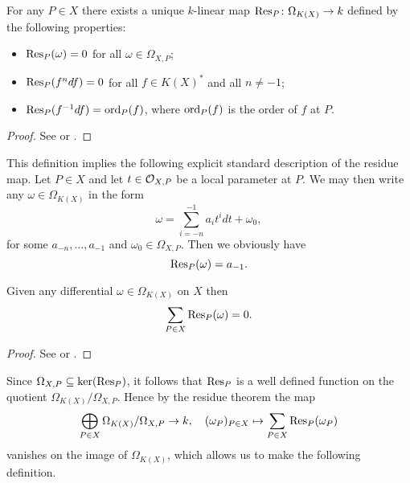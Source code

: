     \begin{thm}\label{theoremresiduemap}
    For any $P\in X$ there exists a unique $k$-linear map $\operatorname{Res}_P \colon \Omega_{K(X)} \rightarrow k$ defined by the following properties:
        \begin{itemize}
            \item $\operatorname{Res}_P(\omega) = 0$ for all $\omega \in \Omega_{X,P}$;
            \item $\operatorname{Res}_P(f^ndf) = 0$ for all $f \in K(X)^*$ and all $n \neq -1$;
            \item $\operatorname{Res}_P(f^{-1}df) = \operatorname{ord}_P(f)$, where $\operatorname{ord}_P(f)$ is the order of $f$ at $P$.
        \end{itemize}
    \end{thm}
    \begin{proof}
    See \cite[Chap.\ II, \S 7 and \S 11]{algebraicgroupsandclassfields} or \cite{residuesofdifferentialsoncurve}.
    \end{proof}

This definition implies the following explicit standard description of the residue map.
Let $P \in X$ and let $t \in {\cal O}_{X,P}$ be a local parameter at $P$.
We may then write any $\omega \in \Omega_{K(X)}$ in the form 
    \[
    \omega = \sum_{i = -n}^{-1} a_i t^i dt + \omega_0,
    \]
for some $a_{-n}, \ldots, a_{-1}$ and $\omega_0 \in \Omega_{X,P}$.
Then we obviously have
    \[
    \operatorname{Res}_P(\omega) = a_{-1}.
    \]
    

    \begin{thm}\label{theoremresiduetheorem}
    Given any differential $\omega \in \Omega_{K(X)}$ on $X$ then 
        \[
        \sum_{P \in X}\operatorname{Res}_P(\omega) = 0.
        \]  
    \end{thm}
    \begin{proof}
    See \cite[Chap.\ II, Prop.\ 6]{algebraicgroupsandclassfields} or \cite[Pg.\ 155]{residuesofdifferentialsoncurve}.
    \end{proof}

Since $\Omega_{X,P} \subseteq \ker (\operatorname{Res}_P)$, it follows that $\operatorname{Res}_P$ is a well defined function on the quotient $\Omega_{K(X)}/\Omega_{X,P}$.
Hence by the residue theorem the map
    \begin{equation*} 
    \bigoplus_{P \in X} \Omega_{K(X)}/\Omega_{X,P} \rightarrow k, \quad (\omega_P)_{P \in X} \mapsto \sum_{P\in X} \operatorname{Res}_P(\omega_P)
    \end{equation*} 
vanishes on the image of $\Omega_{K(X)}$, which allows us to make the following definition.
    
